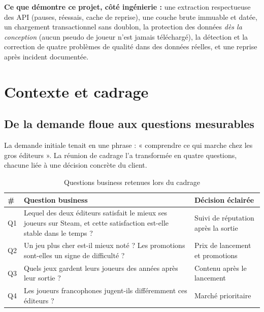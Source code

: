 \documentclass[11pt, a4paper, oneside, headings=normal, numbers=noenddot, DIV=12]{scrartcl}
\begin{document}
\textbf{Ce que démontre ce projet, côté ingénierie :} une extraction respectueuse des API (pauses, réessais, cache de reprise),
une couche brute immuable et datée, un chargement transactionnel sans doublon, la protection des données \emph{dès la conception}
(aucun pseudo de joueur n'est jamais téléchargé), la détection et la correction de quatre problèmes de qualité dans des données réelles,
et une reprise après incident documentée.

\section{Contexte et cadrage}

\subsection{De la demande floue aux questions mesurables}
La demande initiale tenait en une phrase : « comprendre ce qui marche chez les gros éditeurs ». La réunion de cadrage l'a transformée
en quatre questions, chacune liée à une décision concrète du client.

\begin{table}[H]
\centering
\begin{tabularx}{\linewidth}{@{}l Y L{4.1cm}@{}}
\toprule
\textbf{\#} & \textbf{Question business} & \textbf{Décision éclairée} \\
\midrule
Q1 & Lequel des deux éditeurs satisfait le mieux ses joueurs sur Steam, et cette satisfaction est-elle stable dans le temps ? & Suivi de réputation après la sortie \\
Q2 & Un jeu plus cher est-il mieux noté ? Les promotions sont-elles un signe de difficulté ? & Prix de lancement et promotions \\
Q3 & Quels jeux gardent leurs joueurs des années après leur sortie ? & Contenu après le lancement \\
Q4 & Les joueurs francophones jugent-ils différemment ces éditeurs ? & Marché prioritaire \\
\bottomrule
\end{tabularx}
\caption{Questions business retenues lors du cadrage}
\end{table}
\end{document}
